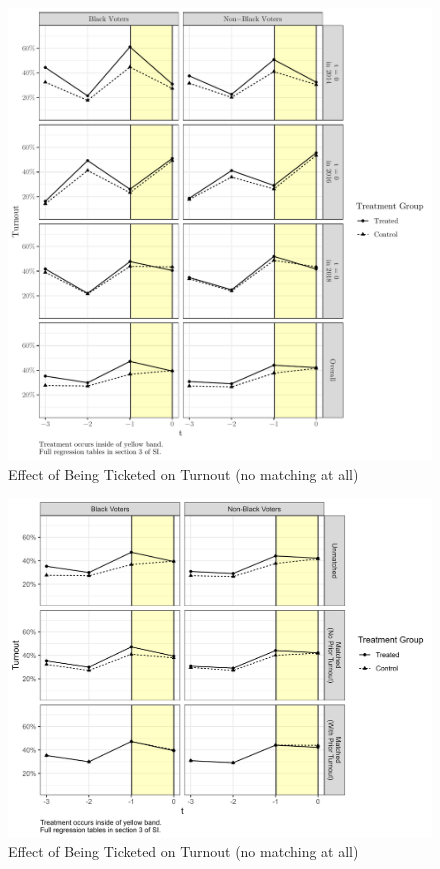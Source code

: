 \documentclass[
  12pt,
]{article}
\begin{document}
\begin{figure}[H]

{\centering \includegraphics{compile_files/figure-latex/did-no-matching-1} 

}

\caption{\label{fig:did-1}Effect of Being Ticketed on Turnout (no matching at all)}\label{fig:did-no-matching}
\end{figure}

\begin{figure}[H]

{\centering \includegraphics{compile_files/figure-latex/did-different-approaches-1} 

}

\caption{\label{fig:did-1}Effect of Being Ticketed on Turnout (no matching at all)}\label{fig:did-different-approaches}
\end{figure}
\end{document}
